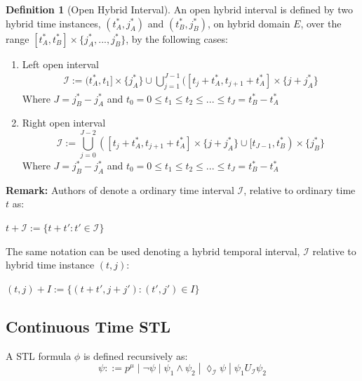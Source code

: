 \documentclass{article}
\theoremstyle{definition}
\newtheorem{definition}{Definition}[section]
\begin{document}
\begin{definition}[Open Hybrid Interval]
An open hybrid interval is defined by two hybrid time instances,
$(t^*_A,j^*_A)$ and $(t^*_B,j^*_B)$, on hybrid domain $E$, over the
range $[t^*_A, t^*_B]\times\{j^*_A,..., j^*_B\}$, by the following cases:

\begin{enumerate}
    \item Left open interval
    \begin{gather}
        \mathcal{I} := (t^*_A, t_1] \times \{j^*_A\} \cup
        \bigcup\limits_{j=1}^{J-1} ([t_j+t^*_A,t_{j+1}+t^*_A] \times \{j+j^*_A\} 
    \end{gather}
    Where $J = j^*_B - j^*_A$ and $t_0 = 0 \leq t_1 \leq t_2 \leq ... \leq t_J = t^*_B - t^*_A$

    \item Right open interval
    \begin{equation}
        \mathcal{I} :=  \bigcup\limits_{j=0}^{J-2} ([t_j+t^*_A,t_{j+1}+t^*_A] \times \{j+j^*_A\} 
                         \cup [t_{J-1}, t^*_B) \times \{j^*_B\}
    \end{equation}
    Where $J = j^*_B - j^*_A$ and $t_0 = 0 \leq t_1 \leq t_2 \leq ... \leq t_J = t^*_B - t^*_A$
\end{enumerate}

\end{definition}


\clearpage
\begin{flushleft}
\textbf{Remark:}
Authors of \cite{hutchison_robust_2010} denote a ordinary time interval $\mathcal{I}$, relative to ordinary time $t$ as: 
\end{flushleft}

\begin{center}
$t + \mathcal{I} := \{t+t': t' \in \mathcal{I}\}$ 
\end{center}
The same notation can be used denoting a hybrid temporal interval, $\mathcal{I}$ relative to hybrid time instance $(t,j)$:
\begin{center}
    $(t,j) + I := \{(t+t',j+j'): (t',j') \in I\}$
\end{center}


\clearpage
\subsection{Continuous Time STL}
A STL formula $\phi$ is defined recursively as:
\begin{equation}
    \psi ::= p^\mu\;|\;\lnot \psi\;|\;\psi_1 \land \psi_2\;|\;\lozenge_{\mathcal{I}} \psi\;|\;\psi_1 U_{\mathcal{I}} \psi_2
\end{equation}
\end{document}
